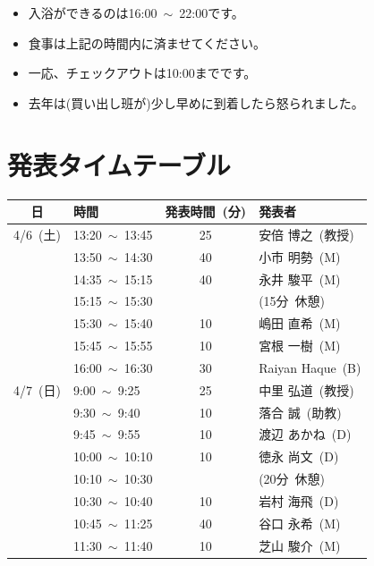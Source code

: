 \documentclass[unicode,a4paper,11pt]{ltjsarticle}
\begin{document}
\begin{itemize}
  \item
        入浴ができるのは16:00\ $\sim$\ 22:00です。
  \item
        食事は上記の時間内に済ませてください。
  \item
        一応、チェックアウトは10:00までです。
  \item
        去年は(買い出し班が)少し早めに到着したら怒られました。
\end{itemize}

\section{発表タイムテーブル}

\begin{center}
  \begin{tabular}{clcl}\hline
    日        & 時間                 & 発表時間\ (分) & 発表者            \\ \hline
    4/6\ (土) & 13:20\ $\sim$\ 13:45 & 25             & 安倍 博之\ (教授) \\
              & 13:50\ $\sim$\ 14:30 & 40             & 小市 明勢\ (M)    \\
              & 14:35\ $\sim$\ 15:15 & 40             & 永井 駿平\ (M)    \\
              & 15:15\ $\sim$\ 15:30 &                & (15分\ 休憩)      \\
              & 15:30\ $\sim$\ 15:40 & 10             & 嶋田 直希\ (M)    \\
              & 15:45\ $\sim$\ 15:55 & 10             & 宮根 一樹\ (M)    \\
              & 16:00\ $\sim$\ 16:30 & 30             & Raiyan Haque\ (B) \\ \hline
    4/7\ (日) & 9:00\ $\sim$\ 9:25   & 25             & 中里 弘道\ (教授) \\
              & 9:30\ $\sim$\ 9:40   & 10             & 落合 誠\ (助教)   \\
              & 9:45\ $\sim$\ 9:55   & 10             & 渡辺 あかね\ (D)  \\
              & 10:00\ $\sim$\ 10:10 & 10             & 徳永 尚文\ (D)    \\
              & 10:10\ $\sim$\ 10:30 &                & (20分\ 休憩)      \\
              & 10:30\ $\sim$\ 10:40 & 10             & 岩村 海飛\ (D)    \\
              & 10:45\ $\sim$\ 11:25 & 40             & 谷口 永希\ (M)    \\
              & 11:30\ $\sim$\ 11:40 & 10             & 芝山 駿介\ (M)    \\ \hline
  \end{tabular}
\end{center}
\end{document}
